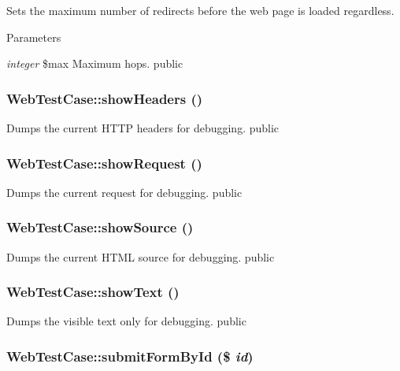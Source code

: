 \label{class_web_test_case_a1a94a628582b9cdb0610ee5772c0c5b9}
Sets the maximum number of redirects before the web page is loaded regardless. 
\begin{DoxyParams}{Parameters}
\item[{\em integer}]\$max Maximum hops.  public \end{DoxyParams}
\hypertarget{class_web_test_case_a9cb4dfc25c77a145504e46b8eb3acd5d}{
\subsubsection[{showHeaders}]{\setlength{\rightskip}{0pt plus 5cm}WebTestCase::showHeaders ()}}
\label{class_web_test_case_a9cb4dfc25c77a145504e46b8eb3acd5d}
Dumps the current HTTP headers for debugging.  public \hypertarget{class_web_test_case_ade23ffdc160a37580518c0afc3657aa2}{
\subsubsection[{showRequest}]{\setlength{\rightskip}{0pt plus 5cm}WebTestCase::showRequest ()}}
\label{class_web_test_case_ade23ffdc160a37580518c0afc3657aa2}
Dumps the current request for debugging.  public \hypertarget{class_web_test_case_a01442fb03a6a4e700e0eb22c79aaec98}{
\subsubsection[{showSource}]{\setlength{\rightskip}{0pt plus 5cm}WebTestCase::showSource ()}}
\label{class_web_test_case_a01442fb03a6a4e700e0eb22c79aaec98}
Dumps the current HTML source for debugging.  public \hypertarget{class_web_test_case_a7060ba1f005664015384f1280fb8c9a3}{
\subsubsection[{showText}]{\setlength{\rightskip}{0pt plus 5cm}WebTestCase::showText ()}}
\label{class_web_test_case_a7060ba1f005664015384f1280fb8c9a3}
Dumps the visible text only for debugging.  public \hypertarget{class_web_test_case_addbc36aa63cbd70458383bc2fae78c03}{
\subsubsection[{submitFormById}]{\setlength{\rightskip}{0pt plus 5cm}WebTestCase::submitFormById (\$ {\em id})}}
